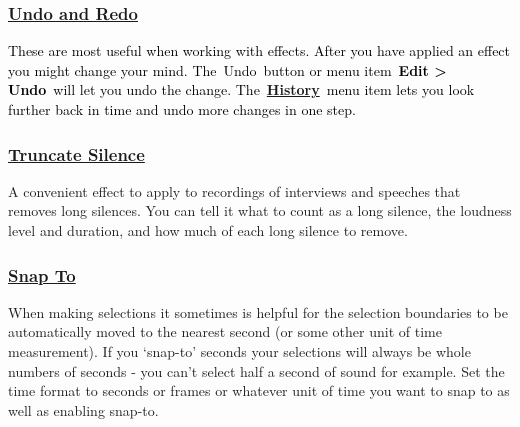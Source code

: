 \documentclass[letterpaper]{article}
\begin{document}
\subsubsection[Undo and
Redo]{\href{https://manual.audacityteam.org/man/undo_redo_and_history.html}{\textcolor[rgb]{0.3529412,0.21176471,0.5882353}{Undo
and Redo}}}
\textcolor{black}{These are most useful when working with effects. After you have applied an effect you might change
your mind. The~Undo~button or menu item~}\textbf{\textcolor{black}{Edit {\textgreater} Undo}}\textcolor{black}{~will
let you undo the change.
The~}\href{https://manual.audacityteam.org/man/undo_redo_and_history.html#history}{\textbf{\textcolor[rgb]{0.3529412,0.21176471,0.5882353}{History}}}\textcolor{black}{~menu
item lets you look further back in time and undo more changes in one step.}

\subsubsection[Truncate
Silence]{\href{https://manual.audacityteam.org/man/truncate_silence.html}{\textcolor[rgb]{0.3529412,0.21176471,0.5882353}{Truncate
Silence}}}
{\color{black}
A convenient effect to apply to recordings of interviews and speeches that removes long silences. You can tell it what
to count as a long silence, the loudness level and duration, and how much of each long silence to remove.}

\subsubsection[Snap
To]{\href{https://manual.audacityteam.org/man/selection_toolbar.html\#snap}{\textcolor[rgb]{0.3529412,0.21176471,0.5882353}{Snap
To}}}
{\color{black}
When making selections it sometimes is helpful for the selection boundaries to be automatically moved to the nearest
second (or some other unit of time measurement). If you `snap-to' seconds your selections will always be whole numbers
of seconds - you can't select half a second of sound for example. Set the time format to seconds or frames or whatever
unit of time you want to snap to as well as enabling snap-to.}
\end{document}
